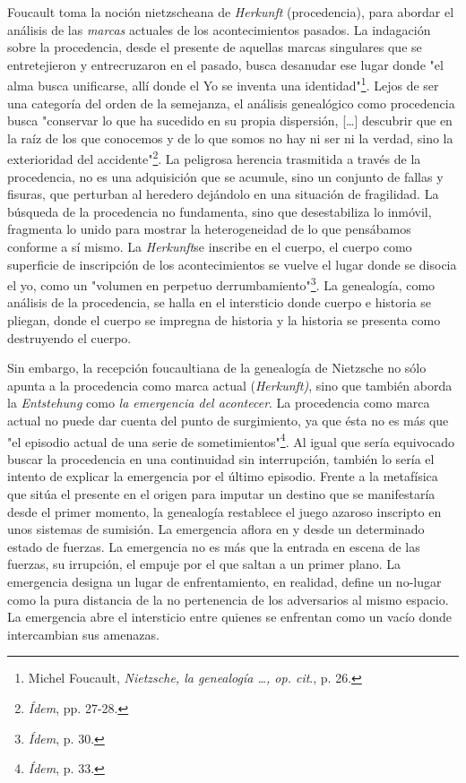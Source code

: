 \documentclass{book}
\begin{document}
Foucault toma la noción nietzscheana de \emph{Herkunft} (procedencia),
para abordar el análisis de las \emph{marcas} actuales de los
acontecimientos pasados. La indagación sobre la procedencia, desde el
presente de aquellas marcas singulares que se entretejieron y
entrecruzaron en el pasado, busca desanudar ese lugar donde "el alma
busca unificarse, allí donde el Yo se inventa una identidad"\footnote{Michel
  Foucault, \emph{Nietzsche, la genealogía \ldots, op. cit}., p. 26.}.
Lejos de ser una categoría del orden de la semejanza, el análisis
genealógico como procedencia busca "conservar lo que ha sucedido en su
propia dispersión, {[}\ldots{]} descubrir que en la raíz de los que
conocemos y de lo que somos no hay ni ser ni la verdad, sino la
exterioridad del accidente"\footnote{\emph{Ídem}, pp. 27-28.}. La
peligrosa herencia trasmitida a través de la procedencia, no es una
adquisición que se acumule, sino un conjunto de fallas y fisuras, que
perturban al heredero dejándolo en una situación de fragilidad. La
búsqueda de la procedencia no fundamenta, sino que desestabiliza lo
inmóvil, fragmenta lo unido para mostrar la heterogeneidad de lo que
pensábamos conforme a sí mismo. La \emph{Herkunft}se inscribe en el
cuerpo, el cuerpo como superficie de inscripción de los acontecimientos
se vuelve el lugar donde se disocia el yo, como un "volumen en perpetuo
derrumbamiento"\footnote{\emph{Ídem}, p. 30.}. La genealogía, como
análisis de la procedencia, se halla en el intersticio donde cuerpo e
historia se pliegan, donde el cuerpo se impregna de historia y la
historia se presenta como destruyendo el cuerpo.

Sin embargo, la recepción foucaultiana de la genealogía de Nietzsche no
sólo apunta a la procedencia como marca actual (\emph{Herkunft)}, sino
que también aborda la \emph{Entstehung} como \emph{la emergencia del
acontecer}. La procedencia como marca actual no puede dar cuenta del
punto de surgimiento, ya que ésta no es más que "el episodio actual de
una serie de sometimientos"\footnote{\emph{Ídem}, p. 33.}. Al igual que
sería equivocado buscar la procedencia en una continuidad sin
interrupción, también lo sería el intento de explicar la emergencia por
el último episodio. Frente a la metafísica que sitúa el presente en el
origen para imputar un destino que se manifestaría desde el primer
momento, la genealogía restablece el juego azaroso inscripto en unos
sistemas de sumisión. La emergencia aflora en y desde un determinado
estado de fuerzas. La emergencia no es más que la entrada en escena de
las fuerzas, su irrupción, el empuje por el que saltan a un primer
plano. La emergencia designa un lugar de enfrentamiento, en realidad,
define un no-lugar como la pura distancia de la no pertenencia de los
adversarios al mismo espacio. La emergencia abre el intersticio entre
quienes se enfrentan como un vacío donde intercambian sus amenazas.
\end{document}
